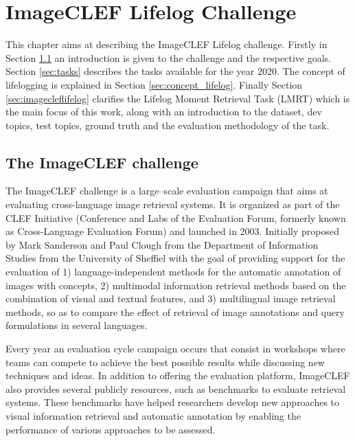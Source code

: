 \cleardoublepage

\chapter{ImageCLEF Lifelog Challenge}
\label{ch:imageclef}

This chapter aims at describing the ImageCLEF Lifelog challenge. Firstly in Section \ref{sec:introduct} an introduction is given to the challenge and the respective goals. Section \ref{sec:tasks} describes the tasks available for the year 2020. The concept of lifelogging is explained in Section \ref{sec:concept_lifelog}. Finally Section \ref{sec:imagecleflifelog} clarifies the Lifelog Moment Retrieval Task (LMRT) which is the main focus of this work, along with an introduction to the dataset, dev topics, test topics, ground truth and the evaluation methodology of the task.



\section{The ImageCLEF challenge}
\label{sec:introduct}

The ImageCLEF challenge is a large–scale evaluation campaign that aims at evaluating cross-language image retrieval systems. It is organized as part of the CLEF Initiative (Conference and Labs of the Evaluation Forum, formerly known as Cross-Language Evaluation Forum) and launched in  2003. Initially proposed by Mark Sanderson and Paul Clough from the Department of Information Studies from the University of Sheffiel with the goal of providing support for the evaluation of 1) language-independent methods for the automatic annotation of images with concepts, 2) multimodal information retrieval methods based on the combination of visual and textual features, and 3) multilingual image retrieval methods, so as to compare the effect of retrieval of image annotations and query formulations in several languages.


Every year an evaluation cycle campaign occurs that consist in workshops where teams can compete to achieve the best possible results while discussing new techniques and ideas. In addition to offering the evaluation platform, ImageCLEF also provides several publicly resources, such as benchmarks to evaluate retrieval systems. These benchmarks have helped researchers develop new approaches to visual information retrieval and automatic annotation by enabling the performance of various approaches to be assessed.

